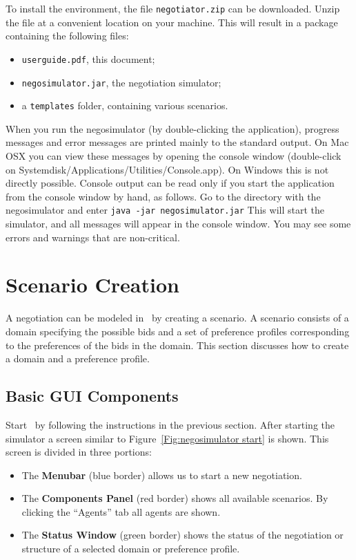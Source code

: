 \documentclass[]{article}
\begin{document}
To install the environment, the file \texttt{negotiator.zip} can be downloaded. Unzip the file at a convenient location on your machine. This will result in a package containing the following files:

\begin{itemize}
	\item \texttt{userguide.pdf}, this document;
	\item \texttt{negosimulator.jar}, the negotiation simulator;
	\item a \texttt{templates} folder, containing various scenarios.
\end{itemize}

When you run the negosimulator (by double-clicking the application), progress messages and error messages are printed mainly to the standard output. On Mac OSX you can view these messages by opening the console window (double-click on Systemdisk/Applications/Utilities/Console.app). On Windows this is not directly possible. Console output can be read only if you start the application from the console window by hand, as follows. Go to the directory with the negosimulator and enter
\texttt{java -jar negosimulator.jar}
This will start the simulator, and all messages will appear in the console window. You may see some errors and warnings that are non-critical.

\section{Scenario Creation}
A negotiation can be modeled in \Genius~by creating a scenario. A scenario consists of a domain specifying the possible bids and a set of preference profiles corresponding to the preferences of the bids in the domain. This section discusses how to create a domain and a preference profile.

\subsection{Basic GUI Components}
Start \Genius~by following the instructions in the previous section. After starting the simulator a screen similar to Figure~\ref{Fig:negosimulator start} is shown. This screen is divided in three portions:

\begin{itemize}
	\item The \textbf{Menubar} (blue border) allows us to start a new negotiation.
	\item The \textbf{Components Panel} (red border) shows all available scenarios. By clicking the ``Agents'' tab all agents are shown.
	\item The \textbf{Status Window} (green border) shows the status of the negotiation or structure of a selected domain or preference profile.
\end{itemize}
\end{document}

